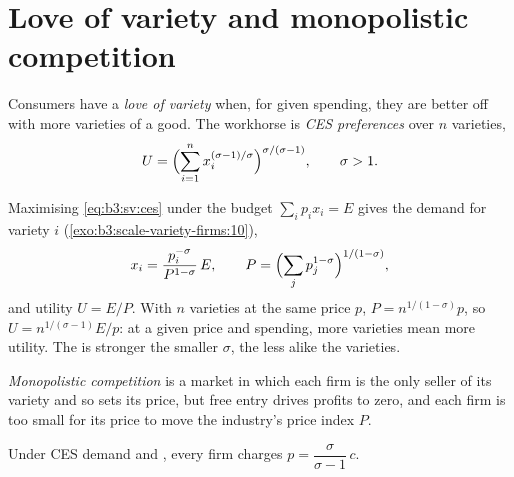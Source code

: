\section{Love of variety and monopolistic competition}\label{sec:b3:scale-variety-firms:variety}

\begin{definition}\label{def:b3:scale-variety-firms:variety}
Consumers have a \emph{love of variety} when, for given spending, they are
better off with more varieties of a good. The workhorse is \emph{CES
preferences} over $n$ varieties,
\begin{equation}\label{eq:b3:sv:ces}
  U = \Bigl(\sum_{i=1}^n x_i^{(\sigma - 1)/\sigma}\Bigr)^{\sigma/(\sigma - 1)}, \qquad \sigma > 1 .
\end{equation}
\end{definition}

Maximising \eqref{eq:b3:sv:ces} under the budget $\sum_i p_i x_i = E$ gives the
demand for variety $i$ (\cref{exo:b3:scale-variety-firms:10}),
\begin{equation}\label{eq:b3:sv:demand}
  x_i = \frac{p_i^{-\sigma}}{P^{1-\sigma}}\, E, \qquad P = \Bigl(\sum_j p_j^{1-\sigma}\Bigr)^{1/(1-\sigma)} ,
\end{equation}
and utility $U = E/P$. With $n$ varieties at the same price $p$, $P = n^{1/(1-\sigma)}p$,
so $U = n^{1/(\sigma-1)} E/p$: at a given price and spending, more varieties mean
more utility. The  is stronger the smaller $\sigma$, the less
alike the varieties.

\begin{definition}\label{def:b3:scale-variety-firms:monopolistic-competition}
\emph{Monopolistic competition} is a market in which each firm is the only
seller of its variety and so sets its price, but free entry drives profits to
zero, and each firm is too small for its price to move the industry's price
index $P$.
\end{definition}

\begin{proposition}\label{prop:b3:scale-variety-firms:markup}
Under CES demand and , every firm charges $p = \dfrac{\sigma}{\sigma - 1}\, c$.
\end{proposition}


